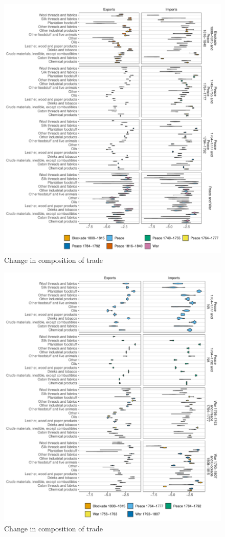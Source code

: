 \documentclass[12pt,a4paper,notitlepage,english]{article}
\begin{document}
\begin{appendix}
\begin{figure}[h!]
\caption{Change in composition of trade}
\label{fig:violin_nat_sitc1_XI1}
\includegraphics[scale=.9]{violin_nat_sitc1_XI1}
\end{figure}
\begin{figure}[h!]
\caption{Change in composition of trade}
\label{fig:violin_nat_sitc1_XI2}
\includegraphics[scale=.9]{violin_nat_sitc1_XI2}
\end{figure}


\end{appendix}
\end{document}
